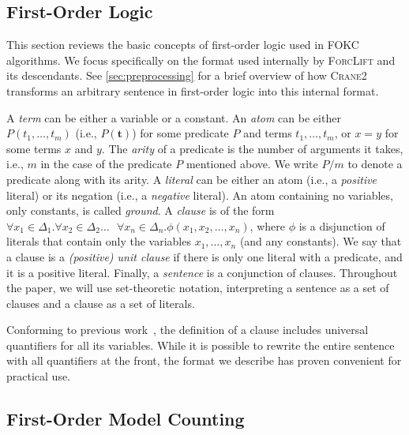 \documentclass[a4paper,UKenglish,cleveref,autoref,table]{lipics-v2021}
\newcommand{\Cranetwo}{\textsc{Crane2}}
\begin{document}
\subsection{First-Order Logic}\label{sec:logic}

This section reviews the basic concepts of first-order logic used in FOKC
algorithms. We focus specifically on the format used internally by
\textsc{ForcLift} and its descendants. See \cref{sec:preprocessing} for a brief
overview of how \Cranetwo{} transforms an arbitrary sentence in first-order
logic into this internal format.

A \emph{term} can be either a variable or a constant. An \emph{atom} can be
either $P(t_{1}, \dots, t_{m})$ (i.e., $P(\mathbf{t})$) for some predicate $P$
and terms $t_{1}, \dots, t_{m}$, or $x=y$ for some terms $x$ and $y$. The
\emph{arity} of a predicate is the number of arguments it takes, i.e., $m$ in
the case of the predicate $P$ mentioned above. We write $P/m$ to denote a
predicate along with its arity. A \emph{literal} can be either an atom (i.e., a
\emph{positive} literal) or its negation (i.e., a \emph{negative} literal). An
atom containing no variables, only constants, is called \emph{ground}. A
\emph{clause} is of the form $\forall x_{1} \in \Delta_{1}\text{.
}\forall x_{2} \in \Delta_{2}\dots\text{ }\forall x_{n} \in \Delta_{n}\text{.
}\phi(x_{1}, x_{2}, \dots, x_{n})$, where $\phi$ is a disjunction of literals
that contain only the variables $x_{1}, \dots, x_{n}$ (and any constants). We
say that a clause is a \emph{(positive) unit clause} if there is only one
literal with a predicate, and it is a positive literal. Finally, a
\emph{sentence} is a conjunction of clauses. Throughout the paper, we will use
set-theoretic notation, interpreting a sentence as a set of clauses and a clause
as a set of literals.

\begin{remark*}
  Conforming to previous work~\cite{DBLP:conf/ijcai/BroeckTMDR11}, the
  definition of a clause includes universal quantifiers for all its variables.
  While it is possible to rewrite the entire sentence with all quantifiers at
  the front, the format we describe has proven convenient for practical use.
\end{remark*}

\subsection{First-Order Model Counting}\label{sec:fomc}
\end{document}
